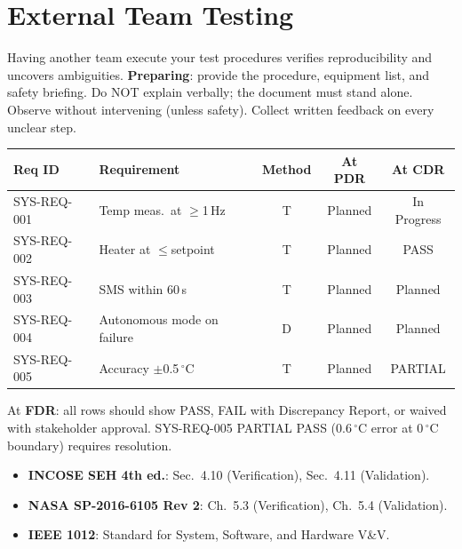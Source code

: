 \documentclass[11pt,letterpaper,twoside,openany]{book}
\newcommand{\degC}{\ensuremath{{}^{\circ}\text{C}}}
\begin{document}
\section{External Team Testing}
Having another team execute your test procedures verifies reproducibility and uncovers ambiguities. \textbf{Preparing}: provide the procedure, equipment list, and safety briefing. Do NOT explain verbally; the document must stand alone. Observe without intervening (unless safety). Collect written feedback on every unclear step.

\begin{greenshieldbox}
\small
\begin{tabularx}{\textwidth}{l l c c c}
\toprule
\textbf{Req ID} & \textbf{Requirement} & \textbf{Method} & \textbf{At PDR} & \textbf{At CDR} \\
\midrule
SYS-REQ-001 & Temp meas.\ at $\geq$1\,Hz & T & Planned & In Progress \\
SYS-REQ-002 & Heater at $\leq$setpoint & T & Planned & PASS \\
SYS-REQ-003 & SMS within 60\,s & T & Planned & Planned \\
SYS-REQ-004 & Autonomous mode on failure & D & Planned & Planned \\
SYS-REQ-005 & Accuracy $\pm$0.5\,\degC{} & T & Planned & PARTIAL \\
\bottomrule
\end{tabularx}

At \textbf{FDR}: all rows should show PASS, FAIL with Discrepancy Report, or waived with stakeholder approval. SYS-REQ-005 PARTIAL PASS (0.6\,\degC{} error at 0\,\degC{} boundary) requires resolution.
\end{greenshieldbox}

\begin{keyconceptbox}
\begin{itemize}[nosep,leftmargin=1.5em]
\item \textbf{INCOSE SEH 4th ed.}: Sec.\ 4.10 (Verification), Sec.\ 4.11 (Validation).
\item \textbf{NASA SP-2016-6105 Rev 2}: Ch.\ 5.3 (Verification), Ch.\ 5.4 (Validation).
\item \textbf{IEEE 1012}: Standard for System, Software, and Hardware V\&V.
\end{itemize}
\end{keyconceptbox}
\end{document}
